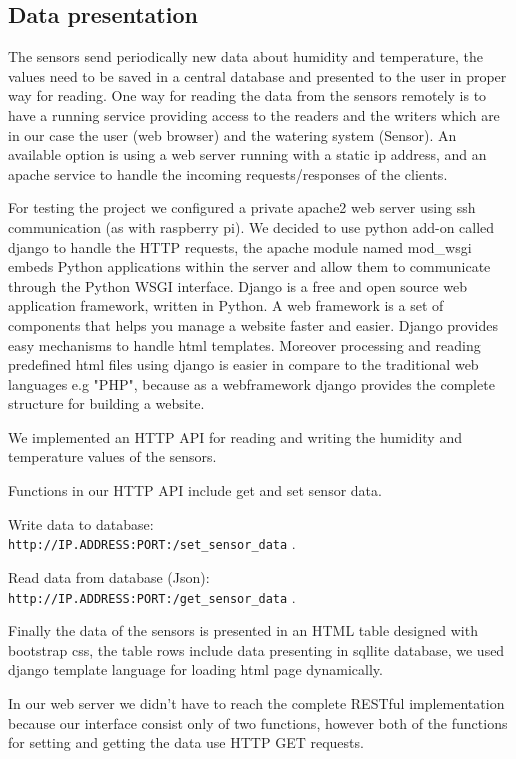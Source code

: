 \documentclass[11pt,paper=a4,parskip=half]{scrartcl}
\begin{document}
\subsection{Data presentation}

The sensors send periodically new data about humidity and temperature, the
values need to be saved in a central database and presented to the user in
proper way for reading.
One way for reading the data from the sensors remotely is to have a running
service providing access to the readers and the writers which are in our case
the user (web browser) and the watering system (Sensor). An available option is
using a web server running with a static ip address, and an apache service to
handle the incoming requests/responses of the clients.

For testing the project
we configured a private apache2 web server using ssh communication (as with
raspberry pi). We decided to use python add-on called django to handle the HTTP
requests, the apache module named mod\_wsgi embeds Python applications within
the server and allow them to communicate through the Python WSGI interface.
Django is a free and open source web application framework, written in Python.
A web framework is a set of components that helps you manage a website faster
and easier. Django provides easy mechanisms to handle html templates. Moreover
processing and reading predefined html files using django is easier in compare
to the traditional web languages e.g "PHP", because as a webframework django
provides the complete structure for building a website.

We implemented an HTTP API for reading and writing the humidity and temperature
values of the sensors.

Functions in our HTTP API include get and set sensor data.

Write data to database:
\\ \texttt{http://IP.ADDRESS:PORT:/set\_sensor\_data} .

Read data from database (Json):
\\ \texttt{http://IP.ADDRESS:PORT:/get\_sensor\_data} .

Finally the data of the sensors is presented in an HTML table designed with
bootstrap css, the table rows include data presenting in sqllite database, we
used django template language for loading html page dynamically.

In our web server we didn't have to reach the complete RESTful implementation
because our interface consist only of two functions, however both of the
functions for setting and getting the data use HTTP GET requests.
\end{document}
